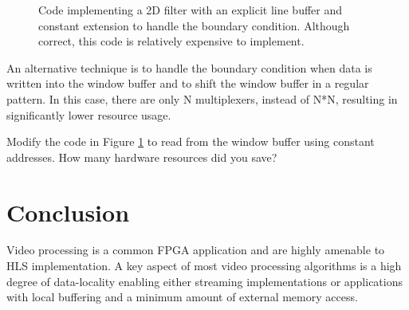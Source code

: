 \begin{figure}

\caption{Code implementing a 2D filter with an explicit line buffer and constant extension to handle the boundary condition.   Although correct, this code is relatively expensive to implement.}\label{fig:video:boundaryConditionExtendBad}
\end{figure}

An alternative technique is to handle the boundary condition when data is written into the window buffer and to shift the window buffer in a regular pattern.  In this case, there are only N multiplexers, instead of N*N, resulting in significantly lower resource usage.  

\begin{exercise}
Modify the code in Figure \ref{fig:video:boundaryConditionExtendBad} to read from the window buffer using constant addresses.  How many hardware resources did you save?
\end{exercise}


\section{Conclusion}

Video processing is a common FPGA application and are highly amenable to HLS implementation.  A key aspect of most video processing algorithms is a high degree of data-locality enabling either streaming implementations or applications with local buffering and a minimum amount of external memory access.

